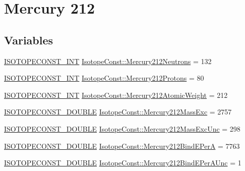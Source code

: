 \hypertarget{group___isotope_const-_mercury-_hg212}{}\section{Mercury 212}
\label{group___isotope_const-_mercury-_hg212}
\subsection*{Variables}
\begin{DoxyCompactItemize}
\item 
\mbox{\hyperlink{group___isotope_const-_macros_ga5f18360b3e99483a35c32d789e62621c}{I\+S\+O\+T\+O\+P\+E\+C\+O\+N\+S\+T\+\_\+\+I\+NT}} \mbox{\hyperlink{group___isotope_const-_mercury-_hg212_ga0a9db3de8487fc369a5cd182ce5ecb3e}{Isotope\+Const\+::\+Mercury212\+Neutrons}} = 132
\item 
\mbox{\hyperlink{group___isotope_const-_macros_ga5f18360b3e99483a35c32d789e62621c}{I\+S\+O\+T\+O\+P\+E\+C\+O\+N\+S\+T\+\_\+\+I\+NT}} \mbox{\hyperlink{group___isotope_const-_mercury-_hg212_ga09f54237bd8ab9018f9acff6e8557264}{Isotope\+Const\+::\+Mercury212\+Protons}} = 80
\item 
\mbox{\hyperlink{group___isotope_const-_macros_ga5f18360b3e99483a35c32d789e62621c}{I\+S\+O\+T\+O\+P\+E\+C\+O\+N\+S\+T\+\_\+\+I\+NT}} \mbox{\hyperlink{group___isotope_const-_mercury-_hg212_ga620a5d9b1ddd705bcfd08218ae07a5f1}{Isotope\+Const\+::\+Mercury212\+Atomic\+Weight}} = 212
\item 
\mbox{\hyperlink{group___isotope_const-_macros_ga8f45a7272ce02c0b4c65c44636ed719a}{I\+S\+O\+T\+O\+P\+E\+C\+O\+N\+S\+T\+\_\+\+D\+O\+U\+B\+LE}} \mbox{\hyperlink{group___isotope_const-_mercury-_hg212_ga84b2dc56e9271b00e3a87cd4a79efa18}{Isotope\+Const\+::\+Mercury212\+Mass\+Exc}} = 2757
\item 
\mbox{\hyperlink{group___isotope_const-_macros_ga8f45a7272ce02c0b4c65c44636ed719a}{I\+S\+O\+T\+O\+P\+E\+C\+O\+N\+S\+T\+\_\+\+D\+O\+U\+B\+LE}} \mbox{\hyperlink{group___isotope_const-_mercury-_hg212_gaae80b30df60446fd08d1a1555c6524d0}{Isotope\+Const\+::\+Mercury212\+Mass\+Exc\+Unc}} = 298
\item 
\mbox{\hyperlink{group___isotope_const-_macros_ga8f45a7272ce02c0b4c65c44636ed719a}{I\+S\+O\+T\+O\+P\+E\+C\+O\+N\+S\+T\+\_\+\+D\+O\+U\+B\+LE}} \mbox{\hyperlink{group___isotope_const-_mercury-_hg212_ga5d5b4bfe6582fefb37a80074b8f71411}{Isotope\+Const\+::\+Mercury212\+Bind\+E\+PerA}} = 7763
\item 
\mbox{\hyperlink{group___isotope_const-_macros_ga8f45a7272ce02c0b4c65c44636ed719a}{I\+S\+O\+T\+O\+P\+E\+C\+O\+N\+S\+T\+\_\+\+D\+O\+U\+B\+LE}} \mbox{\hyperlink{group___isotope_const-_mercury-_hg212_gaa5c2f914260af358447133b081b263f5}{Isotope\+Const\+::\+Mercury212\+Bind\+E\+Per\+A\+Unc}} = 1

\end{DoxyCompactItemize}
